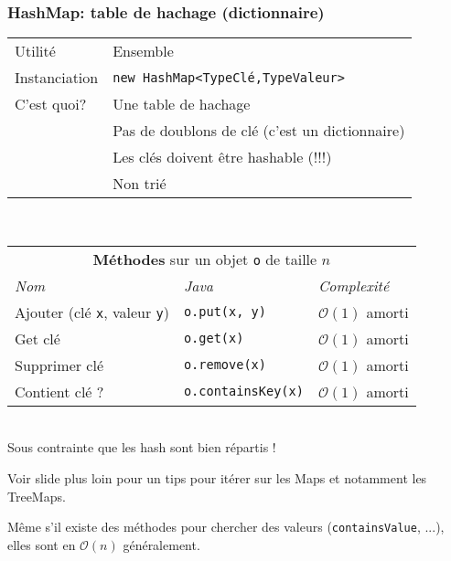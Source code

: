 \documentclass[8pt,aspectratio=169]{beamer}
\begin{document}
\begin{frame}
\frametitle{HashMap: table de hachage (dictionnaire)}
\centering
\begin{tabular}{ll}
	Utilité & Ensemble\\
	Instanciation & \texttt{new HashMap<TypeClé,TypeValeur>}\\
	C'est quoi? & Une table de hachage\\
	& \color{red} Pas de doublons de clé (c'est un dictionnaire)\\
	& \color{red} Les clés doivent être hashable (!!!)\\
	& \color{red} Non trié
	
\end{tabular}\\
\vspace{0.5cm}
\centering
\begin{tabular}{lll}
	\multicolumn{3}{c}{\textbf{Méthodes} sur un objet \texttt{o} de taille $n$} \\
	\textit{Nom} & \textit{Java} & \textit{Complexité} \\
	Ajouter (clé \texttt{x}, valeur \texttt{y})& \texttt{o.put(x, y)} & $\mathcal{O}(1)$ \color{orange} amorti\\
	Get clé & \texttt{o.get(x)} & $\mathcal{O}(1)$ \color{orange} amorti\\
	Supprimer clé & \texttt{o.remove(x)} & $\mathcal{O}(1)$ \color{orange} amorti\\
	Contient clé ? & \texttt{o.containsKey(x)} & $\mathcal{O}(1)$ \color{orange} amorti\\
\end{tabular}\\
\vspace{0.5cm}
\color{blue} Sous contrainte que les hash sont bien répartis !

\color{blue} Voir slide plus loin pour un tips pour itérer sur les Maps et notamment les TreeMaps.

\color{red} Même s'il existe des méthodes pour chercher des valeurs (\texttt{containsValue}, ...), elles sont en $\mathcal{O}(n)$ généralement.
\end{frame}
\end{document}
